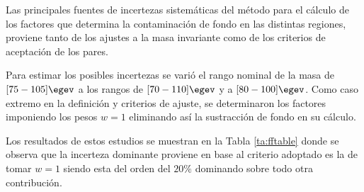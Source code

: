 
Las principales fuentes de incertezas sistemáticas del método para el cálculo de los factores que determina la contaminación de fondo en las distintas regiones, proviene tanto de los ajustes a la masa invariante como de los criterios de aceptación de los pares.  

Para estimar los posibles incertezas se varió el rango nominal de la masa de $[75-105]\egev$ a los rangos de $[70-110]\egev$ y a $[80-100]\egev$. Como caso extremo en la definición y criterios de ajuste, se determinaron los factores imponiendo los pesos $w=1$ eliminando así la sustracción de fondo en su cálculo. 

Los resultados de estos estudios se muestran en la Tabla \ref{ta:fftable} donde se observa que la incerteza dominante proviene en base al criterio adoptado es la de tomar $w=1$ siendo esta del orden del $20 \%$ dominando sobre todo otra contribución.






